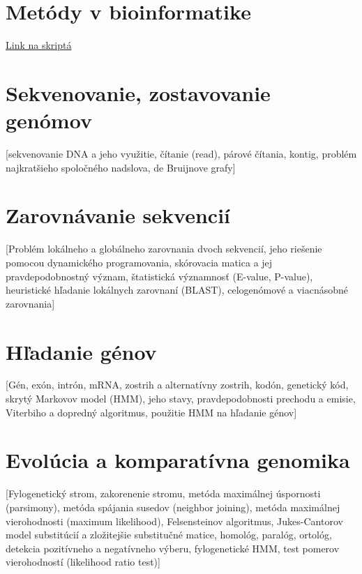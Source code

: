 \chapter[Metódy v bioinformatike]{Metódy v bioinformatike}
\label{metody_v_bioinformatike.tex} %

\href{http://compbio.fmph.uniba.sk/vyuka/mbi/index.php/Predn%C3%A1%C5%A1ky_a_pozn%C3%A1mky}{Link na skriptá}

\chapter{Sekvenovanie, zostavovanie genómov}

	[sekvenovanie DNA a jeho využitie, čítanie (read), párové čítania, kontig, problém najkratšieho spoločného nadslova, de Bruijnove grafy]

\chapter{Zarovnávanie sekvencií}

	[Problém lokálneho a globálneho zarovnania dvoch sekvencií, jeho riešenie pomocou dynamického programovania, skórovacia matica a jej pravdepodobnostný význam, štatistická významnosť (E-value, P-value), heuristické hľadanie lokálnych zarovnaní (BLAST), celogenómové a viacnásobné zarovnania]

\chapter{Hľadanie génov}

	[Gén, exón, intrón, mRNA, zostrih a alternatívny zostrih, kodón, genetický kód, skrytý Markovov model (HMM), jeho stavy, pravdepodobnosti prechodu a emisie, Viterbiho a dopredný algoritmus, použitie HMM na hľadanie génov]

\chapter{Evolúcia a komparatívna genomika}

	[Fylogenetický strom, zakorenenie stromu, metóda maximálnej úspornosti (parsimony), metóda spájania susedov (neighbor joining), metóda maximálnej vierohodnosti (maximum likelihood), Felsensteinov algoritmus, Jukes-Cantorov model substitúcií a zložitejšie substitučné matice, homológ, paralóg, ortológ, detekcia pozitívneho a negatívneho výberu, fylogenetické HMM, test pomerov vierohodností (likelihood ratio test)]

